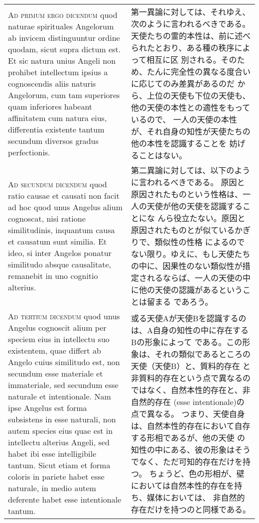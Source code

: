 \documentclass[10pt]{jsarticle} %
\begin{document}
\begin{longtable}{p{21em}p{21em}}
\\


{\scshape Ad primum ergo dicendum} quod naturae
spirituales Angelorum ab invicem distinguuntur ordine quodam, sicut
supra dictum est. Et sic natura unius Angeli non prohibet intellectum
ipsius a cognoscendis aliis naturis Angelorum, cum tam superiores quam
inferiores habeant affinitatem cum natura eius, differentia existente
tantum secundum diversos gradus perfectionis.


&

第一異論に対しては、それゆえ、次のように言われるべきである。
天使たちの霊的本性は、前に述べられたとおり、ある種の秩序によって相互に区
別される。そのため、たんに完全性の異なる度合いに応じてのみ差異があるのだ
 から、上位の天使も下位の天使も、他の天使の本性との適性をもっているので、
 一人の天使の本性が、それ自身の知性が天使たちの他の本性を認識することを
 妨げることはない。

\\


{\scshape Ad secundum dicendum} quod ratio causae et
causati non facit ad hoc quod unus Angelus alium cognoscat, nisi ratione
similitudinis, inquantum causa et causatum sunt similia. Et ideo, si
inter Angelos ponatur similitudo absque causalitate, remanebit in uno
cognitio alterius.

&

第二異論に対しては、以下のように言われるべきである。
原因と原因されたものという性格は、一人の天使が他の天使を認識することにな
 んら役立たない。原因と原因されたものとが似ているかぎりで、類似性の性格
 によるのでない限り。ゆえに、もし天使たちの中に、因果性のない類似性が措
 定されるならば、一人の天使の中に他の天使の認識があるということは留まる
 であろう。

\\


{\scshape Ad tertium dicendum} quod unus Angelus
cognoscit alium per speciem eius in intellectu suo existentem, quae
differt ab Angelo cuius similitudo est, non secundum esse materiale et
immateriale, sed secundum esse naturale et intentionale. Nam ipse
Angelus est forma subsistens in esse naturali, non autem species eius
quae est in intellectu alterius Angeli, sed habet ibi esse intelligibile
tantum. Sicut etiam et forma coloris in pariete habet esse naturale, in
medio autem deferente habet esse intentionale tantum.

&

或る天使Aが天使Bを認識するのは、A自身の知性の中に存在するBの形象によって
 である。この形象は、それの類似であるところの天使（天使B）と、質料的存在
 と非質料的存在という点で異なるのではなく、自然本性的存在と、非自然的存在
 (esse intentionale)の点で異なる。
つまり、天使自身は、自然本性的存在において自存する形相であるが、他の天使
 の知性の中にある、彼の形象はそうでなく、ただ可知的存在だけを持つ。
ちょうど、色の形相が、壁においては自然本性的存在を持ち、媒体においては、
 非自然的存在だけを持つのと同様である。


\end{longtable}
\end{document}
